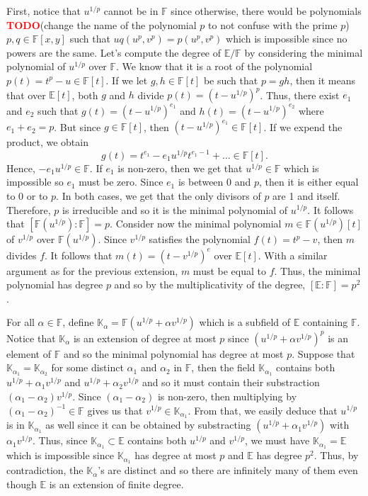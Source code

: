 \documentclass{article}
\theoremstyle{plain}
\theoremstyle{definition}
\newcommand{\F}{\mathbb{F}}
\newcommand{\E}{\mathbb{E}}
\newcommand{\K}{\mathbb{K}}
\newcommand{\td}{\textcolor{red}{\textbf{TODO}}}
\begin{document}
First, notice that $u^{1/p}$ cannot be in $\F$ since otherwise, there would be polynomials \td (change the name of the polynomial $p$ to not confuse with the prime $p$) $p,q \in \F[x,y]$ such that $uq(u^p,v^p) = p(u^p,v^p)$ which is impossible since no powers are the same. Let's compute the degree of $\E / \F$ by considering the minimal polynomial of $u^{1/p}$ over $\F$. We know that it is a root of the polynomial $p(t) = t^p - u \in \F[t]$. If we let $g,h \in \F[t]$ be such that $p = gh$, then it means that over $\E[t]$, both $g$ and $h$ divide $p(t)=(t - u^{1/p})^p$. Thus, there exist $e_1$ and $e_2$ such that $g(t) = (t - u^{1/p})^{e_1}$ and $h(t) = (t - u^{1/p})^{e_2}$ where $e_1 + e_2 = p$. But since $g \in \F[t]$, then $(t-u^{1/p})^{e_1} \in \F[t]$. If we expend the product, we obtain
$$g(t) = t^{e_1} - e_1 u^{1/p}t^{e_1 - 1} + \dots \in \F[t].$$
Hence, $-e_1 u^{1/p} \in \F$. If $e_1$ is non-zero, then we get that $u^{1/p} \in \F$ which is impossible so $e_1$ must be zero. Since $e_1$ is between 0 and $p$, then it is either equal to 0 or to $p$. In both cases, we get that the only divisors of $p$ are 1 and itself. Therefore, $p$ is irreducible and so it is the minimal polynomial of $u^{1/p}$. It follows that $[\F(u^{1/p}) : \F] = p$. Consider now the minimal polynomial $m\in \F(u^{1/p})[t]$ of $v^{1/p}$ over $\F(u^{1/p})$. Since $v^{1/p}$ satisfies the polynomial $f(t) = t^p - v$, then $m$ divides $f$. It follows that $m(t) = (t - v^{1/p})^e$ over $\E[t]$. With a similar argument as for the previous extension, $m$ must be equal to $f$. Thus, the minimal polynomial has degree $p$ and so by the multiplicativity of the degree, $[\E : \F] = p^2$.

For all $\alpha \in \F$, define $\K_{\alpha} = \F(u^{1/p} + \alpha v^{1/p})$ which is a subfield of $\E$ containing $\F$. Notice that $\K_\alpha$ is an extension of degree at most $p$ since $(u^{1/p} + \alpha v^{1/p})^p$ is an element of $\F$ and so the minimal polynomial has degree at most $p$. Suppose that $\K_{\alpha_1} = \K_{\alpha_2}$ for some distinct $\alpha_1$ and $\alpha_2$ in $\F$, then the field $\K_{\alpha_1}$ contains both $u^{1/p} + \alpha_1 v^{1/p}$ and $u^{1/p} + \alpha_2 v^{1/p}$ and so it must contain their substraction $(\alpha_1 - \alpha_2)v^{1/p}$. Since $(\alpha_1 - \alpha_2)$ is non-zero, then multiplying by $(\alpha_1 - \alpha_2)^{-1} \in \F$ gives us that $v^{1/p} \in \K_{\alpha_1}$. From that, we easily deduce that $u^{1/p}$ is in $\K_{\alpha_1}$ as well since it can be obtained by substracting $(u^{1/p} + \alpha_1 v^{1/p})$ with $\alpha_1 v^{1/p}$. Thus, since $\K_{\alpha_1} \subset \E$ contains both $u^{1/p}$ and $v^{1/p}$, we must have $\K_{\alpha_1} = \E$ which is impossible since $\K_{\alpha_1}$ has degree at most $p$ and $\E$ has degree $p^2$. Thus, by contradiction, the $\K_{\alpha}$'s are distinct and so there are infinitely many of them even though $\E$ is an extension of finite degree.
\end{document}
